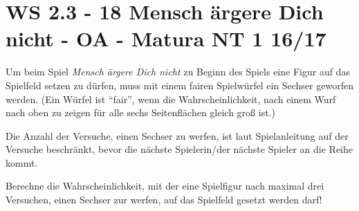 \section{WS 2.3 - 18 Mensch ärgere Dich nicht - OA - Matura NT 1 16/17}

\begin{beispiel}[WS 2.3]{1} %
Um beim Spiel \textit{Mensch ärgere Dich nicht} zu Beginn des Spiels eine Figur auf das Spielfeld setzen zu dürfen, muss mit einem fairen Spielwürfel ein Sechser geworfen werden. (Ein Würfel ist "`fair"', wenn die Wahrscheinlichkeit, nach einem Wurf nach oben zu zeigen für alle sechs Seitenflächen gleich groß ist.)

Die Anzahl der Versuche, einen Sechser zu werfen, ist laut Spielanleitung auf der Versuche beschränkt, bevor die nächste Spielerin/der nächste Spieler an die Reihe kommt.

Berechne die Wahrscheinlichkeit, mit der eine Spielfigur nach maximal drei Versuchen, einen Sechser zur werfen, auf das Spielfeld gesetzt werden darf!

\end{beispiel}